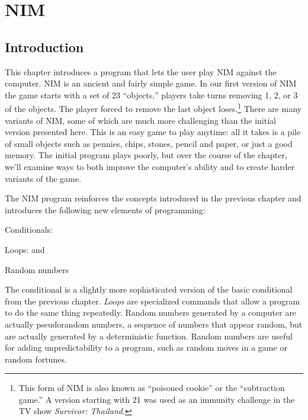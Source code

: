 
\chapter{NIM}\label{ch:NIM}

\section{Introduction}

This chapter introduces a program that lets the user play   NIM against the computer.  NIM is an ancient and fairly simple game.  In our first version of NIM  the game starts with a set of 23 ``objects,'' players take turns removing 1, 2, or 3 of the objects.  The player forced to remove the last object loses.\footnote{This form of NIM is also known as ``poisoned cookie'' or the ``subtraction game.''  A version starting with 21 was used as an immunity challenge in the TV show \emph{Survivor: Thailand}.}    There are many variants of NIM, some of which are much more challenging than the initial version presented here.   
This is an easy game to play anytime: all it takes is a pile of small objects such as pennies, chips, stones, pencil and paper, or just a good memory.  The initial program plays poorly, but over the course of the chapter, we'll examine ways to both improve the computer's ability and to create harder variants of the game.

The NIM program reinforces the concepts introduced in the previous chapter and introduces the following new elements of programming:
\begin{tight_itemize}
   \item Conditionals: 
   \item Loops:  and 
   \item Random numbers
\end{tight_itemize}

The  conditional is a slightly more sophisticated version of the basic  conditional from the previous chapter.  \emph{Loops} are specialized commands that allow a program to do the same thing repeatedly.   Random numbers generated by a computer are actually pseudorandom numbers, a sequence of numbers that appear random, but are actually generated by a deterministic function.   Random numbers are useful for adding unpredictability to a program, such as random moves in a game or random fortunes.

